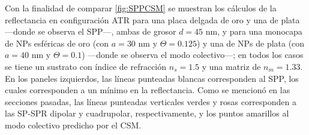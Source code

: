 Con la finalidad de comparar \ref{fig:SPPCSM} se muestran los cálculos de la reflectancia en configuración ATR para una placa delgada de oro y una de plata ---donde se observa el SPP---, ambas de grosor $d=45$ nm, y para una monocapa de NPs esféricas de oro (con $a=30$ nm y $\Theta=0.125$) y una de NPs de plata (con $a=40$ nm y $\Theta=0.1$) ---donde se observa el modo colectivo---; en todos los casos se tiene un sustrato con índice de refracción $n_s=1.5$ y una matriz de $n_m=1.33$. En los paneles izquierdos, las líneas punteadas blancas corresponden al SPP, los cuales corresponden a un mínimo en la reflectancia. Como se mencionó en las secciones pasadas, las líneas punteadas verticales verdes y rosas corresponden a las SP-SPR dipolar y cuadrupolar, respectivamente, y los puntos amarillos al modo colectivo predicho por el CSM.

